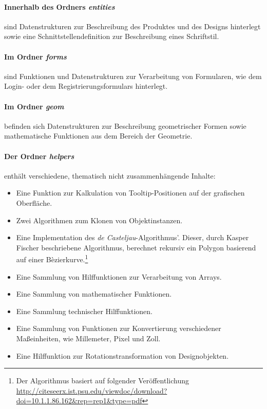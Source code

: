 \paragraph{Innerhalb des Ordners \emph{entities}} sind Datenstrukturen zur Beschreibung des Produktes und des Designs hinterlegt sowie eine Schnittstellendefinition zur Beschreibung eines Schriftstil.

\paragraph{Im Ordner \emph{forms}} sind Funktionen und Datenstrukturen zur Verarbeitung von Formularen, wie dem Login- oder dem Registrierungsformulars hinterlegt.

\paragraph{Im Ordner \emph{geom}} befinden sich Datenstrukturen zur Beschreibung geometrischer Formen sowie mathematische Funktionen aus dem Bereich der Geometrie.

\paragraph{Der Ordner \emph{helpers}} enthält verschiedene, thematisch nicht zusammenhängende Inhalte:
\begin{itemize}
    \item Eine Funktion zur Kalkulation von Tooltip-Positionen auf der grafischen Oberfläche.
    \item Zwei Algorithmen zum Klonen von Objektinstanzen.
    \item Eine Implementation des \emph{de Casteljau}-Algorithmus'. Dieser, durch Kasper Fischer beschriebene Algorithmus, berechnet rekursiv ein Polygon basierend auf einer Bèzierkurve.\footnote{Der Algorithmus basiert auf folgender Veröffentlichung \url{http://citeseerx.ist.psu.edu/viewdoc/download?doi=10.1.1.86.162&rep=rep1&type=pdf}}
    \item Eine Sammlung von Hilffunktionen zur Verarbeitung von Arrays.
    \item Eine Sammlung von mathematischer Funktionen.
    \item Eine Sammlung technischer Hilffunktionen.
    \item Eine Sammlung von Funktionen zur Konvertierung verschiedener Maßeinheiten, wie Millemeter, Pixel und Zoll.
    \item Eine Hilffunktion zur Rotationstransformation von Designobjekten.
\end{itemize}

